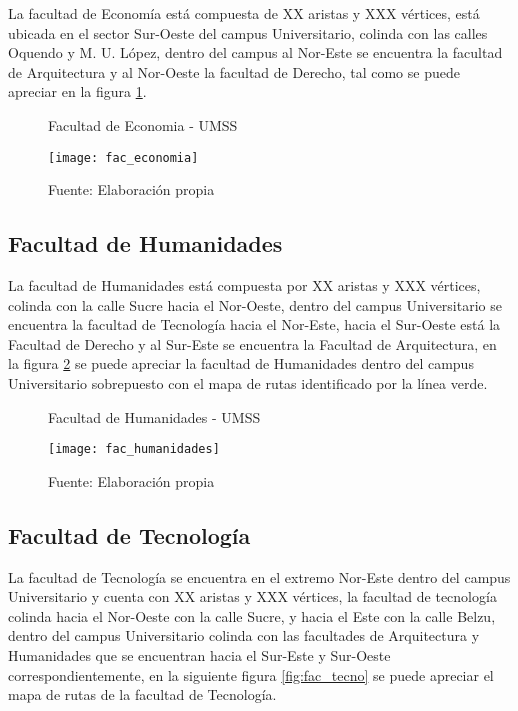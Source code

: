 La facultad de Economía está compuesta de XX aristas y XXX vértices, está ubicada en el sector Sur-Oeste del campus Universitario, colinda con las calles Oquendo y M. U. López, dentro del campus al Nor-Este se encuentra la facultad de Arquitectura y al Nor-Oeste la facultad de Derecho, tal como se puede apreciar en la figura \ref{fig:fac_economia}.

\begin{figure}[H]
  \begin{center}
    \caption{Facultad de Economia - UMSS}
    \label{fig:fac_economia}
    \texttt{[image: fac\_economia]}
    \caption*{Fuente: Elaboración propia}
  \end{center}
\end{figure}



\subsection{Facultad de Humanidades}
\label{sub:facultad_humanidades}

La facultad de Humanidades está compuesta por XX aristas y XXX vértices, colinda con la calle Sucre hacia el Nor-Oeste, dentro del campus Universitario se encuentra la facultad de Tecnología hacia el Nor-Este, hacia el Sur-Oeste está la Facultad de Derecho y al Sur-Este se encuentra la Facultad de Arquitectura, en la figura \ref{fig:fac_humanidades} se puede apreciar la facultad de Humanidades dentro del campus Universitario sobrepuesto con el mapa de rutas identificado por la línea verde.

\begin{figure}[H]
  \begin{center}
    \caption{Facultad de Humanidades - UMSS}
    \label{fig:fac_humanidades}
    \texttt{[image: fac\_humanidades]}
    \caption*{Fuente: Elaboración propia}
  \end{center}
\end{figure}


\subsection{Facultad de Tecnología}
\label{sub:facultad_tecnologia}

La facultad de Tecnología se encuentra en el extremo Nor-Este dentro del campus Universitario y cuenta con XX aristas y XXX vértices, la facultad de tecnología colinda hacia el Nor-Oeste con la calle Sucre, y hacia el Este con la calle Belzu, dentro del campus Universitario colinda con las facultades de Arquitectura y Humanidades que se encuentran hacia el Sur-Este y Sur-Oeste correspondientemente, en la siguiente figura \ref{fig:fac_tecno} se puede apreciar el mapa de rutas de la facultad de Tecnología.

